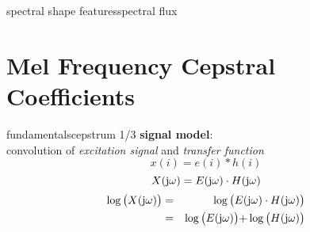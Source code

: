        \begin{frame}{spectral shape features}{spectral flux}
        \end{frame}

    \section[MFCCs]{Mel Frequency Cepstral Coefficients}
		\begin{frame}{fundamentals}{cepstrum 1/3}
			\textbf{signal model}: \\
			convolution of \textit{excitation signal} and \textit{transfer function}
			\begin{equation*}\label{eq:speech}
				x(i) = e(i)\ast h(i)
			\end{equation*}
			\pause
			\begin{equation*}
				X(\mathrm{j}\omega) = E(\mathrm{j}\omega)\cdot H(\mathrm{j}\omega) 
			\end{equation*}
			\pause
			\begin{eqnarray*}
				\log\big(X(\mathrm{j}\omega)\big)	&=& \log\big(E(\mathrm{j}\omega)\cdot H(\mathrm{j}\omega)\big)\nonumber\\
											&=& \log\big(E(\mathrm{j}\omega)\big) \mathbf{+} \log\big(H(\mathrm{j}\omega)\big) 
			\end{eqnarray*}
		\end{frame}

